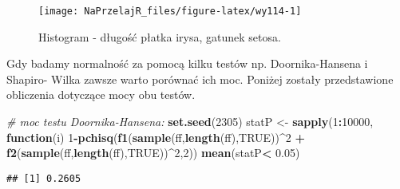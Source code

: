 \documentclass[polish,]{book}
\newenvironment{Shaded}{\begin{snugshade}}{\end{snugshade}}
\newcommand{\CommentTok}[1]{\textcolor[rgb]{0.56,0.35,0.01}{\textit{#1}}}
\newcommand{\ControlFlowTok}[1]{\textcolor[rgb]{0.13,0.29,0.53}{\textbf{#1}}}
\newcommand{\DecValTok}[1]{\textcolor[rgb]{0.00,0.00,0.81}{#1}}
\newcommand{\FloatTok}[1]{\textcolor[rgb]{0.00,0.00,0.81}{#1}}
\newcommand{\KeywordTok}[1]{\textcolor[rgb]{0.13,0.29,0.53}{\textbf{#1}}}
\newcommand{\NormalTok}[1]{#1}
\newcommand{\OperatorTok}[1]{\textcolor[rgb]{0.81,0.36,0.00}{\textbf{#1}}}
\newcommand{\OtherTok}[1]{\textcolor[rgb]{0.56,0.35,0.01}{#1}}
\newcommand{\StringTok}[1]{\textcolor[rgb]{0.31,0.60,0.02}{#1}}
\begin{document}
\begin{figure}[h]

{\centering \texttt{[image: NaPrzelajR\_files/figure-latex/wy114-1]} 

}

\caption{Histogram - długość płatka irysa, gatunek setosa.}\label{fig:wy114}
\end{figure}

Gdy badamy normalność za pomocą kilku testów np. Doornika-Hansena i Shapiro-
Wilka zawsze warto porównać ich moc. Poniżej zostały przedstawione obliczenia
dotyczące mocy obu testów.

\begin{Shaded}
\begin{Highlighting}[]
\CommentTok{# moc testu Doornika-Hansena:}
\KeywordTok{set.seed}\NormalTok{(}\DecValTok{2305}\NormalTok{)}
\NormalTok{statP <-}\StringTok{ }\KeywordTok{sapply}\NormalTok{(}\DecValTok{1}\OperatorTok{:}\DecValTok{10000}\NormalTok{, }\ControlFlowTok{function}\NormalTok{(i) }
  \DecValTok{1}\OperatorTok{-}\KeywordTok{pchisq}\NormalTok{(}\KeywordTok{f1}\NormalTok{(}\KeywordTok{sample}\NormalTok{(ff,}\KeywordTok{length}\NormalTok{(ff),}\OtherTok{TRUE}\NormalTok{))}\OperatorTok{^}\DecValTok{2} \OperatorTok{+}\StringTok{ }\KeywordTok{f2}\NormalTok{(}\KeywordTok{sample}\NormalTok{(ff,}\KeywordTok{length}\NormalTok{(ff),}\OtherTok{TRUE}\NormalTok{))}\OperatorTok{^}\DecValTok{2}\NormalTok{,}\DecValTok{2}\NormalTok{))}
\KeywordTok{mean}\NormalTok{(statP}\OperatorTok{<}\StringTok{ }\FloatTok{0.05}\NormalTok{)}
\end{Highlighting}
\end{Shaded}

\begin{verbatim}
## [1] 0.2605
\end{verbatim}

\begin{Shaded}
\end{Shaded}
\end{document}

